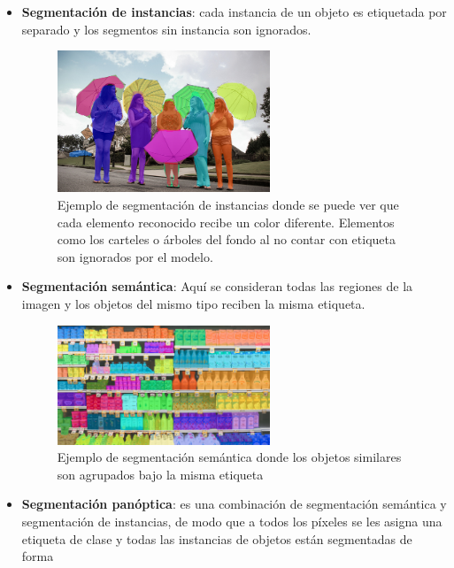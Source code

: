\documentclass[letter,12pt]{report}
\begin{document}
\begin{itemize}
    \item \textbf{Segmentación de instancias}: cada instancia de un objeto es etiquetada por
        separado y los segmentos sin instancia son ignorados.
        \begin{figure}[H]
            \centering
            \includegraphics[width=0.6\textwidth]{segment3}
            \caption{Ejemplo de segmentación de instancias donde se puede ver que cada
            elemento reconocido recibe un color diferente. Elementos como los carteles
            o árboles del fondo al no contar con etiqueta son ignorados por el modelo.}
            \label{fig:segment3}
        \end{figure}
    \item \textbf{Segmentación semántica}: Aquí se consideran todas las regiones de la
        imagen y los objetos del mismo tipo reciben la misma etiqueta.
        \begin{figure}[H]
            \centering
            \includegraphics[width=0.6\textwidth]{segment2}
            \caption{Ejemplo de segmentación semántica donde los objetos similares son
            agrupados bajo la misma etiqueta}
            \label{fig:segment2}
        \end{figure}
    \item \textbf{Segmentación panóptica}: es una combinación de segmentación semántica y
        segmentación de instancias, de modo que a todos los píxeles se les asigna una
        etiqueta de clase y todas las instancias de objetos están segmentadas de forma

\end{itemize}
\end{document}
